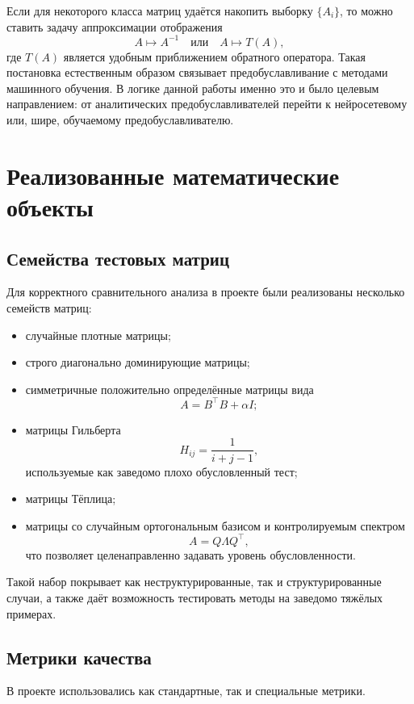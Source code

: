 \documentclass[12pt,a4paper]{article}
\begin{document}
Если для некоторого класса матриц удаётся накопить выборку $\{A_i\}$, то можно ставить задачу аппроксимации отображения
\[
A \mapsto A^{-1}
\quad \text{или} \quad
A \mapsto T(A),
\]
где $T(A)$ является удобным приближением обратного оператора. Такая постановка естественным образом связывает предобуславливание с методами машинного обучения. В логике данной работы именно это и было целевым направлением: от аналитических предобуславливателей перейти к нейросетевому или, шире, обучаемому предобуславливателю.

\section{Реализованные математические объекты}

\subsection{Семейства тестовых матриц}

Для корректного сравнительного анализа в проекте были реализованы несколько семейств матриц:
\begin{itemize}[leftmargin=*]
    \item случайные плотные матрицы;
    \item строго диагонально доминирующие матрицы;
    \item симметричные положительно определённые матрицы вида
    \[
    A=B^\top B + \alpha I;
    \]
    \item матрицы Гильберта
    \[
    H_{ij}=\frac{1}{i+j-1},
    \]
    используемые как заведомо плохо обусловленный тест;
    \item матрицы Тёплица;
    \item матрицы со случайным ортогональным базисом и контролируемым спектром
    \[
    A=Q\Lambda Q^\top,
    \]
    что позволяет целенаправленно задавать уровень обусловленности.
\end{itemize}

Такой набор покрывает как неструктурированные, так и структурированные случаи, а также даёт возможность тестировать методы на заведомо тяжёлых примерах.

\subsection{Метрики качества}

В проекте использовались как стандартные, так и специальные метрики.
\end{document}

